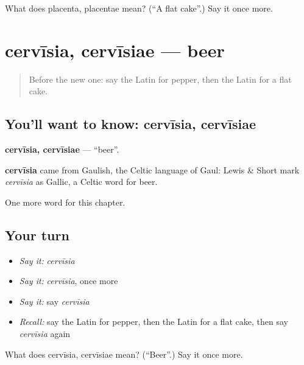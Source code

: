 \begin{tcolorbox}[breakable,colback=teal!4,colframe=teal!35!black,title={Before you move on}]
What does placenta, placentae mean? (\textquotedblleft{}A flat cake\textquotedblright{}.) Say it once more.
\end{tcolorbox}
\section[cervīsia, cervīsiae]{cervīsia, cervīsiae — beer}

\label{lesson:LA-C128-cervisia}



\begin{quote}
Before the new one: say the Latin for pepper, then the Latin for a flat cake.
\end{quote}

\subsection*{You'll want to know: cervīsia, cervīsiae}
\textbf{cervīsia, cervīsiae} — \textquotedblleft{}beer\textquotedblright{}.

\begin{cousinweb}
\textbf{cervīsia} came from Gaulish, the Celtic language of Gaul: Lewis \& Short mark \emph{cervīsia} as Gallic, a Celtic word for beer.
\end{cousinweb}

\begin{grammarlens}[title={What you've built}]
One more word for this chapter.
\end{grammarlens}

\subsection*{Your turn}
\begin{itemize}
\raggedright
  \item \emph{Say it:} \emph{cervīsia}
  \item \emph{Say it:} \emph{cervīsia}, once more
  \item \emph{Say it:} say \emph{cervīsia}
  \item \emph{Recall:} say the Latin for pepper, then the Latin for a flat cake, then say \emph{cervīsia} again
\end{itemize}

\begin{tcolorbox}[breakable,colback=teal!4,colframe=teal!35!black,title={Before you move on}]
What does cervīsia, cervīsiae mean? (\textquotedblleft{}Beer\textquotedblright{}.) Say it once more.
\end{tcolorbox}
